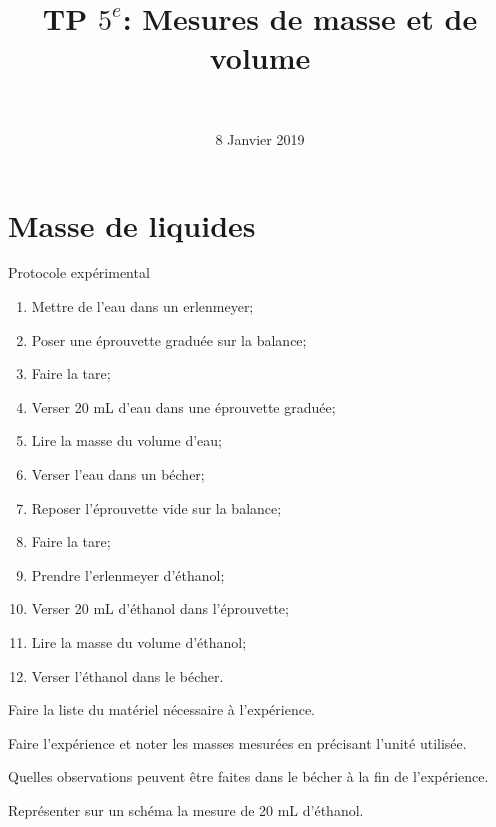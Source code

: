 \documentclass[a4paper,11pt]{exam}
\author{\ }
\date{8 Janvier 2019}
\title{TP $5^e$: Mesures de masse et de volume}
\begin{document}
	\maketitle

\section{Masse de liquides}\label{part:liquide}

\begin{doc}
	\caption{Protocole expérimental}
	\label{doc:proto1}
	\begin{multicols}{2}
			
		\begin{enumerate}[label=\arabic*)]
			\item Mettre de l'eau dans un erlenmeyer;
			\item Poser une éprouvette graduée sur la balance;
			\item Faire la tare;
			\item Verser 20 mL d'eau dans une éprouvette graduée;
			\item Lire la masse du volume d'eau;
			\item Verser l'eau dans un bécher;
			\item Reposer l'éprouvette vide sur la balance;
			\item Faire la tare;
			\item Prendre l'erlenmeyer d'éthanol;
			\item Verser 20 mL d'éthanol dans l'éprouvette;
			\item Lire la masse du volume d'éthanol;
			\item Verser l'éthanol dans le bécher.
		\end{enumerate}
	\end{multicols}
\end{doc}	


\begin{questions}
	
	
	\question Faire la liste du matériel nécessaire à l'expérience.
	
	\fillwithdottedlines{3cm}
	
	\question Faire l'expérience et noter les masses mesurées en précisant l'unité utilisée.
	
	\fillwithdottedlines{1cm}	
	
	\question Quelles observations peuvent être faites dans le bécher à la fin de l'expérience.\label{observations}
	\fillwithdottedlines{1.5cm}
	
	\question Représenter sur un schéma la mesure de 20 mL d'éthanol.
	
	\makeemptybox{6cm}
\end{questions}
\end{document}
